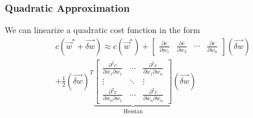\begin{frame}
    \frametitle{Quadratic Approximation}

    We can linearize a quadratic cost function in the form
    \begin{align}
        c(\vec{w}^\ast + \vec{\delta w}) \approx c(\vec{w}^\ast) +
        \begin{bmatrix}
            \frac{\partial c}{\partial w_1} & \frac{\partial c}{\partial w_2} & \cdots & \frac{\partial c}{\partial w_n}
        \end{bmatrix} (\vec{\delta w}) \\
        + \frac{1}{2} (\vec{\delta w})^T
        \underbrace{\begin{bmatrix}
            \frac{\partial^2 c}{\partial w_1 \partial w_1} & \cdots & \frac{\partial^2 c}{\partial w_1 \partial w_n} \\
            \vdots & \ddots & \vdots \\
            \frac{\partial^2 c}{\partial w_n \partial w_1} & \cdots & \frac{\partial^2 c}{\partial w_n \partial w_n}
        \end{bmatrix}}_{\text{Hessian}} (\vec{\delta w})
    \end{align}
\end{frame}
